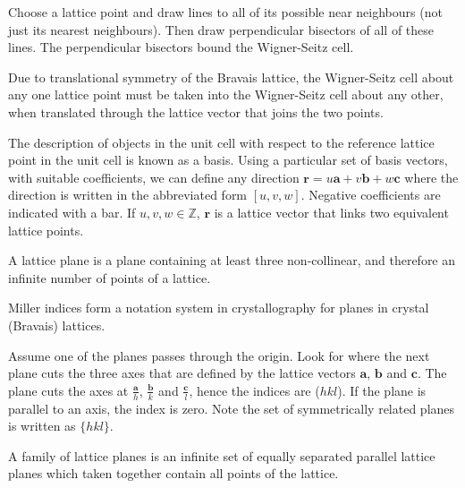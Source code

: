 \documentclass[a4paper]{article}
\begin{document}
\begin{Note}
Choose a lattice point and draw lines to all of its possible near neighbours (not just its nearest neighbours). Then draw perpendicular bisectors of all of these lines. The perpendicular bisectors bound the Wigner-Seitz cell.
\end{Note}
\begin{cor}
Due to translational symmetry of the Bravais lattice, the Wigner-Seitz cell about any one lattice point must be taken into the Wigner-Seitz cell about any other, when translated through the lattice vector that joins the two points.
\end{cor}
\begin{defi}[Basis]
The description of objects in the unit cell with respect to the reference lattice point in the unit cell is known as a basis. Using a particular set of basis vectors, with suitable coefficients, we can define any direction $\mathbf{r}=u\mathbf{a}+v\mathbf{b}+w\mathbf{c}$ where the direction is written in the abbreviated form $[u,v,w]$. Negative coefficients are indicated with a bar. If $u,v,w\in\mathbb{Z}$, $\mathbf{r}$ is a lattice vector that links two equivalent lattice points.
\end{defi}
\begin{defi}
A lattice plane is a plane containing at least three non-collinear, and therefore an infinite number of points of a lattice.
\end{defi}
\begin{defi}
Miller indices form a notation system in crystallography for planes in crystal (Bravais) lattices.
\end{defi}
\begin{Note}
Assume one of the planes passes through the origin. Look for where the next plane cuts the three axes that are defined by the lattice vectors $\mathbf{a}$, $\mathbf{b}$ and $\mathbf{c}$. The plane cuts the axes at $\frac{\mathbf{a}}{h}$, $\frac{\mathbf{b}}{k}$ and $\frac{\mathbf{c}}{l}$, hence the indices are ($hkl$). If the plane is parallel to an axis, the index is zero. Note the set of symmetrically related planes is written as $\{hkl\}$.
\end{Note}
\begin{defi}
A family of lattice planes is an infinite set of equally separated parallel lattice planes which taken together contain all points of the lattice.
\end{defi}
\end{document}
